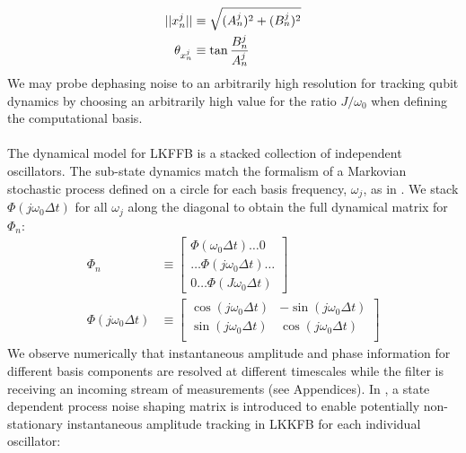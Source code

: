 \begin{align}
||x^j_n|| & \equiv \sqrt{(A^j_{n})^2 + (B^j_{n})^2} \\
\theta_{x^j_n} & \equiv \tan{\frac{B^j_{n}}{A^j_{n}}}
\end{align}
We may probe dephasing noise to an arbitrarily high resolution for tracking qubit dynamics by choosing an arbitrarily high value for the ratio $J/\omega_0$ when defining the computational basis.
\\
\\
The dynamical model for LKFFB is a stacked collection of independent oscillators. The sub-state dynamics match the formalism of a Markovian stochastic process defined on a circle for each basis frequency, $\omega_j$, as in \cite{karlin2012first}. We stack $\Phi(j \omega_0 \Delta t) $ for all $\omega_j$ along the diagonal to obtain the full dynamical matrix for $\Phi_n$:
\begin{align}
\Phi_{n} & \equiv \begin{bmatrix} 
\Phi(\omega_0 \Delta t)\hdots 0  \\ 
 \hdots \Phi(j\omega_0 \Delta t) \hdots \\
0 \hdots \Phi(J \omega_0 \Delta t)  \end{bmatrix}\\ 
\Phi(j \omega_0 \Delta t) &\equiv \begin{bmatrix} \cos(j \omega_0 \Delta t) & -\sin(j \omega_0 \Delta t) \\ \sin(j \omega_0 \Delta t) & \cos(j \omega_0 \Delta t) \\ \end{bmatrix} \label{eqn:ap_approxSP:LKFFB_Phi} 
\end{align}
We observe numerically that instantaneous amplitude and phase information for different basis components are resolved at different timescales while the filter is receiving an incoming stream of measurements (see Appendices). In \cite{livska2007}, a state dependent process noise shaping matrix is introduced to enable potentially non-stationary instantaneous amplitude tracking in LKKFB for each individual oscillator: %
